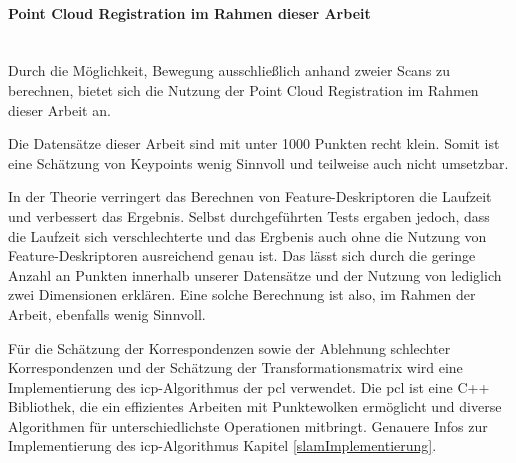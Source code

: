 \paragraph{Point Cloud Registration im Rahmen dieser Arbeit} \mbox{}\\
Durch die Möglichkeit, Bewegung ausschließlich anhand zweier Scans zu berechnen, 
bietet sich die Nutzung der Point Cloud Registration im Rahmen dieser Arbeit an.

Die Datensätze dieser Arbeit sind mit unter 1000 Punkten recht klein.
Somit ist eine Schätzung von Keypoints wenig Sinnvoll und teilweise auch nicht umsetzbar.

In der Theorie verringert das Berechnen von Feature-Deskriptoren die Laufzeit und verbessert das Ergebnis.
Selbst durchgeführten Tests ergaben jedoch, dass die Laufzeit sich verschlechterte 
und das Ergbenis auch ohne die Nutzung von Feature-Deskriptoren ausreichend genau ist.
Das lässt sich durch die geringe Anzahl an Punkten innerhalb unserer Datensätze und der Nutzung von lediglich zwei Dimensionen erklären.
Eine solche Berechnung ist also, im Rahmen der Arbeit, ebenfalls wenig Sinnvoll.

Für die Schätzung der Korrespondenzen sowie der Ablehnung schlechter Korrespondenzen 
und der Schätzung der Transformationsmatrix wird eine Implementierung des \acf{icp}-Algorithmus der \acf{pcl} verwendet.
Die \ac{pcl} ist eine C++ Bibliothek, die ein effizientes Arbeiten mit Punktewolken ermöglicht
und diverse Algorithmen für unterschiedlichste Operationen mitbringt.
Genauere Infos zur Implementierung des \ac{icp}-Algorithmus Kapitel \ref{slamImplementierung}.

\newpage
